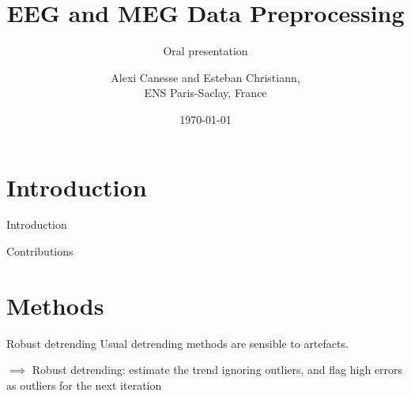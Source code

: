 \documentclass[10pt,serif]{beamer}
\title[] %
{EEG and MEG Data Preprocessing}
\subtitle{Oral presentation}
\author[Esteban Christiann, Alexi Canesse]{{Alexi \sc Canesse} and {Esteban \sc Christiann},\\ ENS Paris-Saclay, France}
\institute[] %
{
    Project for the time series course\\
    Part of the MVA program at ENS Paris-Saclay.\\
}
\date[Oral presentation] %
{\today}
\begin{document}
% 


\begin{frame}
  \titlepage
\end{frame}

\section[\color{white} Introduction]{Introduction}\label{sec:introduction}

\begin{frame}{Introduction}

\end{frame}

\begin{frame}{Contributions}

\end{frame}

\section[\color{white} Methods]{Methods}\label{sec:methods}

\begin{frame}{Robust detrending}
  Usual detrending methods are sensible to artefacts.

  $\implies$ Robust detrending: estimate the trend ignoring outliers, and flag high errors as outliers for the next iteration

\end{frame}
\end{document}
